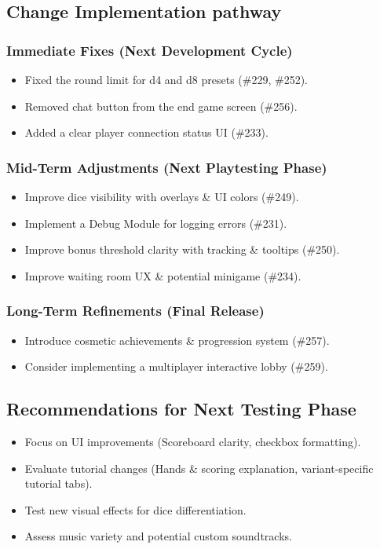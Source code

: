 \documentclass{article}
\begin{document}
\subsection{Change Implementation pathway}

\subsubsection{Immediate Fixes (Next Development Cycle)}
\begin{itemize}
    \item Fixed the round limit for d4 and d8 presets (\#229, \#252).
    \item Removed chat button from the end game screen (\#256).
    \item Added a clear player connection status UI (\#233).
\end{itemize}

\subsubsection{Mid-Term Adjustments (Next Playtesting Phase)}
\begin{itemize}
    \item Improve dice visibility with overlays \& UI colors (\#249).
    \item Implement a Debug Module for logging errors (\#231).
    \item Improve bonus threshold clarity with tracking \& tooltips (\#250).
    \item Improve waiting room UX \& potential minigame (\#234).
\end{itemize}

\subsubsection{Long-Term Refinements (Final Release)}
\begin{itemize}
    \item Introduce cosmetic achievements \& progression system (\#257).
    \item Consider implementing a multiplayer interactive lobby (\#259).
\end{itemize}

\subsection{Recommendations for Next Testing Phase}
\begin{itemize}
    \item Focus on UI improvements (Scoreboard clarity, checkbox formatting).
    \item Evaluate tutorial changes (Hands \& scoring explanation, variant-specific tutorial tabs).
    \item Test new visual effects for dice differentiation.
    \item Assess music variety and potential custom soundtracks.
\end{itemize}
\end{document}
